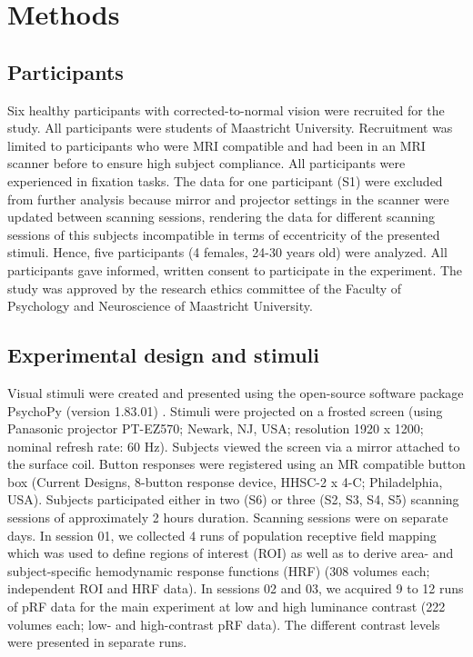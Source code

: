 \section{Methods}

\subsection{Participants}
Six healthy participants with corrected-to-normal vision were recruited for the study. All participants were students of Maastricht University. Recruitment was limited to participants who were MRI compatible and had been in an MRI scanner before to ensure high subject compliance. All participants were experienced in fixation tasks. The data for one participant (S1) were excluded from further analysis because mirror and projector settings in the scanner were updated between scanning sessions, rendering the data for different scanning sessions of this subjects incompatible in terms of eccentricity of the presented stimuli. Hence, five participants (4 females, 24-30 years old) were analyzed. All participants gave informed, written consent to participate in the experiment. The study was approved by the research ethics committee of the Faculty of Psychology and Neuroscience of Maastricht University.

\subsection{Experimental design and stimuli}
Visual stimuli were created and presented using the open-source software package PsychoPy (version 1.83.01) \parencite{Peirce2007,Peirce2008}. Stimuli were projected on a frosted screen (using Panasonic projector PT-EZ570; Newark, NJ, USA; resolution 1920 x 1200; nominal refresh rate: 60 Hz). Subjects viewed the screen via a mirror attached to the surface coil. Button responses were registered using an MR compatible button box (Current Designs, 8-button response device, HHSC-2 x 4-C; Philadelphia, USA). Subjects participated either in two (S6) or three (S2, S3, S4, S5) scanning sessions of approximately 2 hours duration. Scanning sessions were on separate days. In session 01, we collected 4 runs of population receptive field mapping which was used to define regions of interest (ROI) as well as to derive area- and subject-specific hemodynamic response functions (HRF) (308 volumes each; independent ROI and HRF data). In sessions 02 and 03, we acquired 9 to 12 runs of pRF data for the main experiment at low and high luminance contrast (222 volumes each; low- and high-contrast pRF data). The different contrast levels were presented in separate runs.

